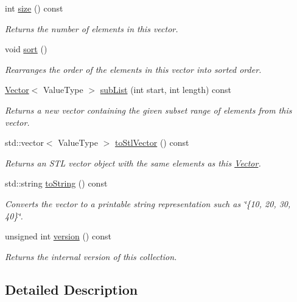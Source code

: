 \begin{DoxyCompactItemize}
int \mbox{\hyperlink{classVector_af9593d4a5ff4274efaf429cb4f9e57cc}{size}} () const
\begin{DoxyCompactList}\small\item\em Returns the number of elements in this vector. \end{DoxyCompactList}\item 
void \mbox{\hyperlink{classVector_a47fdc9eea42b6975cdc835bb2e08810e}{sort}} ()
\begin{DoxyCompactList}\small\item\em Rearranges the order of the elements in this vector into sorted order. \end{DoxyCompactList}\item 
\mbox{\hyperlink{classVector}{Vector}}$<$ Value\+Type $>$ \mbox{\hyperlink{classVector_a68d5113d5e35ad7906cb7d1707621e08}{sub\+List}} (int start, int length) const
\begin{DoxyCompactList}\small\item\em Returns a new vector containing the given subset range of elements from this vector. \end{DoxyCompactList}\item 
std\+::vector$<$ Value\+Type $>$ \mbox{\hyperlink{classVector_a091fed2dc0e91c838fe6e82088629897}{to\+Stl\+Vector}} () const
\begin{DoxyCompactList}\small\item\em Returns an S\+TL vector object with the same elements as this \mbox{\hyperlink{classVector}{Vector}}. \end{DoxyCompactList}\item 
std\+::string \mbox{\hyperlink{classVector_a1fe5121d6528fdea3f243321b3fa3a49}{to\+String}} () const
\begin{DoxyCompactList}\small\item\em Converts the vector to a printable string representation such as \char`\"{}\{10, 20, 30, 40\}\char`\"{}. \end{DoxyCompactList}\item 
unsigned int \mbox{\hyperlink{classVector_a0aa696ccb72cbf928535d6b646bac1aa}{version}} () const
\begin{DoxyCompactList}\small\item\em Returns the internal version of this collection. \end{DoxyCompactList}\end{DoxyCompactItemize}


\subsection{Detailed Description}
